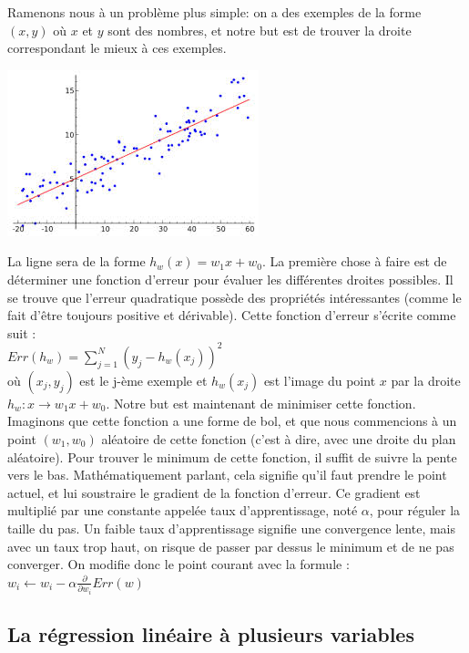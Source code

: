 Ramenons nous à un problème plus simple: on a des exemples de la forme $(x, y)$ où $x$ et $y$ sont des nombres, et notre but est de trouver la droite correspondant le mieux à ces exemples.\\
\begin{center}
\includegraphics[scale=0.7]{chapters/Pictures/linearregression.jpg}\\
\end{center}
La ligne sera de la forme $h_w(x) = w_1x + w_0$. La première chose à faire est de déterminer une fonction d'erreur pour évaluer les différentes droites possibles. Il se trouve que l'erreur quadratique possède des propriétés intéressantes (comme le fait d'être toujours positive et dérivable). Cette fonction d'erreur s'écrite comme suit :\\
$Err(h_w) = \sum\limits_{j=1}^{N}(y_j - h_w(x_j))^{2}$\\
où $(x_j, y_j)$ est le j-ème exemple et $h_w(x_j)$ est l'image du point $x$ par la droite $h_w : x \rightarrow w_1x + w_0$. Notre but est maintenant de minimiser cette fonction. Imaginons que cette fonction a une forme de bol, et que nous commencions à un point $(w_1, w_0)$ aléatoire de cette fonction (c'est à dire, avec une droite du plan aléatoire). Pour trouver le minimum de cette fonction, il suffit de suivre la pente vers le bas. Mathématiquement parlant, cela signifie qu'il faut prendre le point actuel, et lui soustraire le gradient de la fonction d'erreur. Ce gradient est multiplié par une constante appelée taux d'apprentissage, noté $\alpha$, pour réguler la taille du pas. Un faible taux d'apprentissage signifie une convergence lente, mais avec un taux trop haut, on risque de passer par dessus le minimum et de ne pas converger. On modifie donc le point courant avec la formule :\\

$w_i \leftarrow w_i - \alpha \frac{\partial}{\partial w_i} Err(w)$\\

\subsection{La régression linéaire à plusieurs variables}

